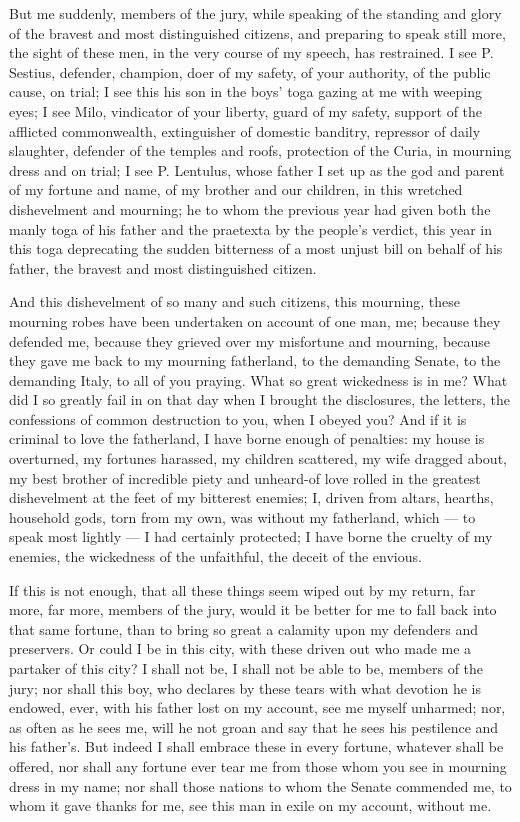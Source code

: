  But me suddenly, members of the jury, while speaking of the standing and glory of the bravest and most distinguished citizens, and preparing to speak still more, the sight of these men, in the very course of my speech, has restrained. I see P. Sestius, defender, champion, doer of my safety, of your authority, of the public cause, on trial; I see this his son in the boys' toga gazing at me with weeping eyes; I see Milo, vindicator of your liberty, guard of my safety, support of the afflicted commonwealth, extinguisher of domestic banditry, repressor of daily slaughter, defender of the temples and roofs, protection of the Curia, in mourning dress and on trial; I see P. Lentulus, whose father I set up as the god and parent of my fortune and name, of my brother and our children, in this wretched dishevelment and mourning; he to whom the previous year had given both the manly toga of his father and the praetexta by the people's verdict, this year in this toga deprecating the sudden bitterness of a most unjust bill on behalf of his father, the bravest and most distinguished citizen.

 And this dishevelment of so many and such citizens, this mourning, these mourning robes have been undertaken on account of one man, me; because they defended me, because they grieved over my misfortune and mourning, because they gave me back to my mourning fatherland, to the demanding Senate, to the demanding Italy, to all of you praying. What so great wickedness is in me? What did I so greatly fail in on that day when I brought the disclosures, the letters, the confessions of common destruction to you, when I obeyed you? And if it is criminal to love the fatherland, I have borne enough of penalties: my house is overturned, my fortunes harassed, my children scattered, my wife dragged about, my best brother of incredible piety and unheard-of love rolled in the greatest dishevelment at the feet of my bitterest enemies; I, driven from altars, hearths, household gods, torn from my own, was without my fatherland, which --- to speak most lightly --- I had certainly protected; I have borne the cruelty of my enemies, the wickedness of the unfaithful, the deceit of the envious.

 If this is not enough, that all these things seem wiped out by my return, far more, far more, members of the jury, would it be better for me to fall back into that same fortune, than to bring so great a calamity upon my defenders and preservers. Or could I be in this city, with these driven out who made me a partaker of this city? I shall not be, I shall not be able to be, members of the jury; nor shall this boy, who declares by these tears with what devotion he is endowed, ever, with his father lost on my account, see me myself unharmed; nor, as often as he sees me, will he not groan and say that he sees his pestilence and his father's. But indeed I shall embrace these in every fortune, whatever shall be offered, nor shall any fortune ever tear me from those whom you see in mourning dress in my name; nor shall those nations to whom the Senate commended me, to whom it gave thanks for me, see this man in exile on my account, without me.


